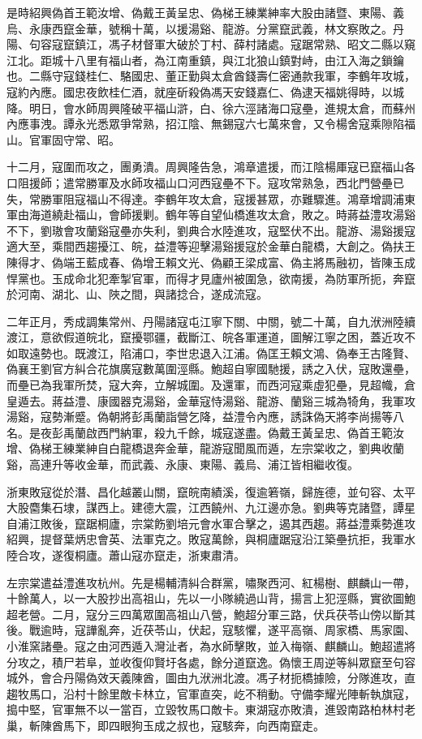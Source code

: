 \begin{pinyinscope}
是時紹興偽首王範汝增、偽戴王黃呈忠、偽梯王練業紳率大股由諸暨、東陽、義烏、永康西竄金華，號稱十萬，以援湯谿、龍游。分黨竄武義，林文察敗之。丹陽、句容寇竄鎮江，馮子材督軍大破於丁村、薛村諸處。寇踞常熟、昭文二縣以窺江北。距城十八里有福山者，為江南重鎮，與江北狼山鎮對峙，由江入海之鎖鑰也。二縣守寇錢桂仁、駱國忠、董正勤與太倉酋錢壽仁密通款我軍，李鶴年攻城，寇約內應。國忠夜飲桂仁酒，就座斫殺偽馮天安錢嘉仁、偽逮天福姚得時，以城降。明日，會水師周興隆破平福山滸，白、徐六涇諸海口寇壘，進規太倉，而蘇州內應事洩。譚永光悉眾爭常熟，招江陰、無錫寇六七萬來會，又令楊舍寇乘隙陷福山。官軍固守常、昭。

十二月，寇圍而攻之，團勇潰。周興隆告急，鴻章遣援，而江陰楊厙寇已竄福山各口阻援師；遣常勝軍及水師攻福山口河西寇壘不下。寇攻常熟急，西北門營壘已失，常勝軍阻寇福山不得達。李鶴年攻太倉，寇援甚眾，亦難驟進。鴻章增調浦東軍由海道繞赴福山，會師援剿。鶴年等自望仙橋進攻太倉，敗之。時蔣益澧攻湯谿不下，劉璈會攻蘭谿寇壘亦失利，劉典合水陸進攻，寇堅伏不出。龍游、湯谿援寇適大至，乘間西趨擾江、皖，益澧等迎擊湯谿援寇於金華白龍橋，大創之。偽扶王陳得才、偽端王藍成春、偽增王賴文光、偽顧王梁成富、偽主將馬融初，皆陳玉成悍黨也。玉成命北犯牽掣官軍，而得才見廬州被圍急，欲南援，為防軍所扼，奔竄於河南、湖北、山、陜之間，與諸捻合，遂成流寇。

二年正月，秀成調集常州、丹陽諸寇屯江寧下關、中關，號二十萬，自九洑洲陸續渡江，意欲假道皖北，竄擾鄂疆，截斷江、皖各軍運道，圖解江寧之困，蓋近攻不如取遠勢也。既渡江，陷浦口，李世忠退入江浦。偽匡王賴文鴻、偽奉王古隆賢、偽襄王劉官方糾合花旗廣寇數萬圍涇縣。鮑超自寧國馳援，誘之入伏，寇敗還壘，而壘已為我軍所焚，寇大奔，立解城圍。及還軍，而西河寇乘虛犯壘，見超幟，倉皇遁去。蔣益澧、康國器克湯谿，金華寇恃湯谿、龍游、蘭谿三城為犄角，我軍攻湯谿，寇勢漸蹙。偽朝將彭禹蘭詣營乞降，益澧令內應，誘誅偽天將李尚揚等八名。是夜彭禹蘭啟西門納軍，殺九千餘，城寇遂盡。偽戴王黃呈忠、偽首王範汝增、偽梯王練業紳自白龍橋退奔金華，龍游寇聞風而遁，左宗棠收之，劉典收蘭谿，高連升等收金華，而武義、永康、東陽、義烏、浦江皆相繼收復。

浙東敗寇從於潛、昌化越叢山關，竄皖南績溪，復逾箬嶺，歸旌德，並句容、太平大股麕集石埭，謀西上。建德大震，江西饒州、九江邊亦急。劉典等克諸暨，譚星自浦江敗後，竄踞桐廬，宗棠飭劉培元會水軍合擊之，遏其西趨。蔣益澧乘勢進攻紹興，提督葉炳忠會英、法軍克之。敗寇萬餘，與桐廬踞寇沿江築壘抗拒，我軍水陸合攻，遂復桐廬。蕭山寇亦竄走，浙東肅清。

左宗棠遣益澧進攻杭州。先是楊輔清糾合群黨，嘯聚西河、紅楊樹、麒麟山一帶，十餘萬人，以一大股抄出高祖山，先以一小隊繞過山背，揚言上犯涇縣，實欲圖鮑超老營。二月，寇分三四萬眾圍高祖山八營，鮑超分軍三路，伏兵茯苓山傍以斷其後。戰逾時，寇譁亂奔，近茯苓山，伏起，寇駭懼，遂平高嶺、周家橋、馬家園、小淮窯諸壘。寇之由河西遁入灣沚者，為水師擊敗，並入梅嶺、麒麟山。鮑超遣將分攻之，積尸若阜，並收復仰賢圩各處，餘分道竄逸。偽懷王周逆等糾眾竄至句容城外，會合丹陽偽效天義陳酋，圖由九洑洲北渡。馮子材扼橋據險，分隊進攻，直趨牧馬口，沿村十餘里敵卡林立，官軍直突，屹不稍動。守備李耀光陣斬執旗寇，搗中堅，官軍無不以一當百，立毀牧馬口敵卡。東湖寇亦敗潰，進毀南路柏林村老巢，斬陳酋馬下，即四眼狗玉成之叔也，寇駭奔，向西南竄走。


\end{pinyinscope}

